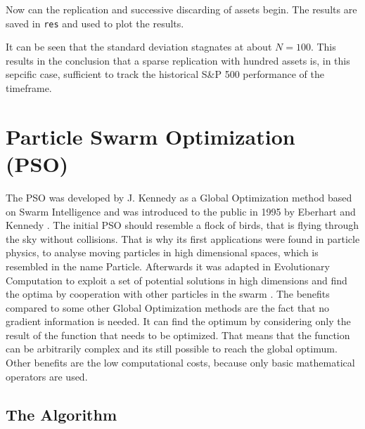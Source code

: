 \documentclass[
  oneside]{book}
\begin{document}
Now can the replication and successive discarding of assets begin. The results are saved in \texttt{res} and used to plot the results.

It can be seen that the standard deviation stagnates at about \(N=100\). This results in the conclusion that a sparse replication with hundred assets is, in this sepcific case, sufficient to track the historical S\&P 500 performance of the timeframe.

\hypertarget{particle-swarm-optimization-pso}{%
\chapter{Particle Swarm Optimization (PSO)}\label{particle-swarm-optimization-pso}}

The PSO was developed by J. Kennedy as a Global Optimization method based on Swarm Intelligence and was introduced to the public in 1995 by Eberhart and Kennedy \citep{KeEb1995}. The initial PSO should resemble a flock of birds, that is flying through the sky without collisions. That is why its first applications were found in particle physics, to analyse moving particles in high dimensional spaces, which is resembled in the name Particle. Afterwards it was adapted in Evolutionary Computation to exploit a set of potential solutions in high dimensions and find the optima by cooperation with other particles in the swarm \citep{PaVr2002}. The benefits compared to some other Global Optimization methods are the fact that no gradient information is needed. It can find the optimum by considering only the result of the function that needs to be optimized. That means that the function can be arbitrarily complex and its still possible to reach the global optimum. Other benefits are the low computational costs, because only basic mathematical operators are used.

\hypertarget{the-algorithm}{%
\section{The Algorithm}\label{the-algorithm}}
\end{document}
